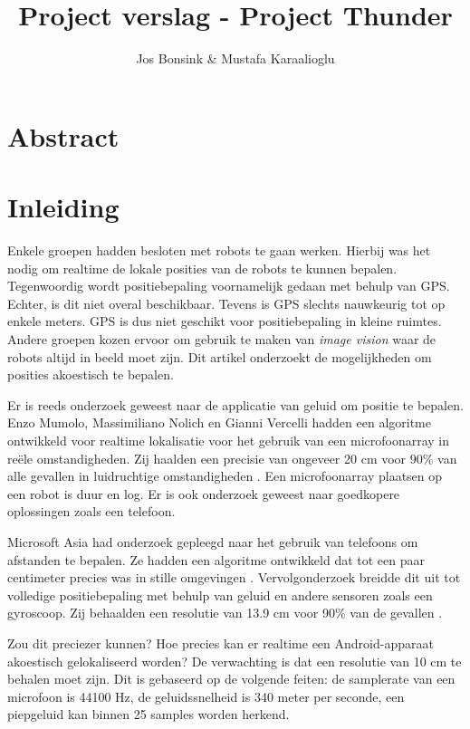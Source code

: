 \documentclass[12pt]{article}
\author{Jos Bonsink \& Mustafa Karaalioglu}
\begin{document}
\title{Project verslag - Project Thunder}
\maketitle

\section{Abstract}

\section{Inleiding}

Enkele groepen hadden besloten met robots te gaan werken. Hierbij was het nodig om realtime de lokale posities van de robots te kunnen bepalen. Tegenwoordig wordt positiebepaling voornamelijk gedaan met behulp van GPS. Echter, is dit niet overal beschikbaar. Tevens is GPS slechts nauwkeurig tot op enkele meters. GPS is dus niet geschikt voor positiebepaling in kleine ruimtes. Andere groepen kozen ervoor om gebruik te maken van \textit{image vision} waar de robots altijd in beeld moet zijn. Dit artikel onderzoekt de mogelijkheden om posities akoestisch te bepalen.

Er is reeds onderzoek geweest naar de applicatie van geluid om positie te bepalen. Enzo Mumolo, Massimiliano Nolich en Gianni Vercelli hadden een algoritme ontwikkeld voor realtime lokalisatie voor het gebruik van een microfoonarray in re\"ele omstandigheden. Zij haalden een precisie van ongeveer 20 cm voor 90\% van alle gevallen in luidruchtige omstandigheden \cite{mumolo2003algorithms}. Een microfoonarray plaatsen op een robot is duur en log. Er is ook onderzoek geweest naar goedkopere oplossingen zoals een telefoon. 

Microsoft Asia had onderzoek gepleegd naar het gebruik van telefoons om afstanden te bepalen. Ze hadden een algoritme ontwikkeld dat tot een paar centimeter precies was in stille omgevingen \cite{peng2007beepbeep}. Vervolgonderzoek breidde dit uit tot volledige positiebepaling met behulp van geluid en andere sensoren zoals een gyroscoop. Zij behaalden een resolutie van 13.9 cm voor 90\% van de gevallen \cite{qiu2011feasibility}.

Zou dit preciezer kunnen? Hoe precies kan er realtime een Android-apparaat akoestisch gelokaliseerd worden? De verwachting is dat een resolutie van 10 cm te behalen moet zijn. Dit is gebaseerd op de volgende feiten: de samplerate van een microfoon is 44100 Hz, de geluidssnelheid is 340 meter per seconde, een piepgeluid kan binnen 25 samples worden herkend.
\end{document}
